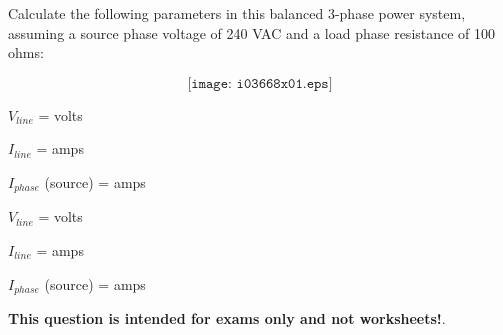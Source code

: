 

Calculate the following parameters in this balanced 3-phase power system, assuming a source phase voltage of 240 VAC and a load phase resistance of 100 ohms:

$$\texttt{[image: i03668x01.eps]}$$

$V_{line}$ = \underbar{\hskip 50pt} volts

\vskip 10pt

$I_{line}$ = \underbar{\hskip 50pt} amps

\vskip 10pt

$I_{phase}$ (source) = \underbar{\hskip 50pt} amps







$V_{line}$ =  volts

$I_{line}$ =  amps

$I_{phase}$ (source) =  amps







{\bf This question is intended for exams only and not worksheets!}.


